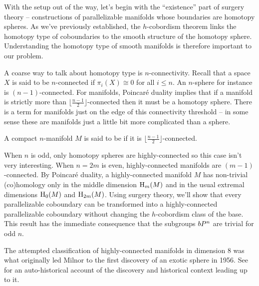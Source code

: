 With the setup out of the way, let's begin with the ``existence'' part of surgery theory -- constructions of parallelizable manifolds whose boundaries are homotopy spheres. As we've previously established, the $h$-cobordism theorem links the homotopy type of coboundaries to the smooth structure of the homotopy sphere. Understanding the homotopy type of smooth manifolds is therefore important to our problem.

A coarse way to talk about homotopy type is $n$-connectivity. Recall that a space $X$ is said to be $n$-connected if $\pi_i(X)\cong 0$ for all $i\leq n$. An $n$-sphere for instance is $(n-1)$-connected. For manifolds, Poincar\'e duality implies that if a manifold is strictly more than $\lfloor \frac{n-1}{2} \rfloor$-connected then it must be a homotopy sphere. There is a term for manifolds just on the edge of this connectivity threshold -- in some sense these are manifolds just a little bit more complicated than a sphere.

\begin{definition}
	A compact $n$-manifold $M$ is said to be  if it is $\lfloor \frac{n-1}{2} \rfloor$-connected. 
\end{definition}

When $n$ is odd, only homotopy spheres are highly-connected so this case isn't very interesting. When $n=2m$ is even, highly-connected manifolds are $(m-1)$-connected.
By Poincar\'e duality, a highly-connected manifold $M$ has non-trivial (co)homology only in the middle dimension $\operatorname{H}_m(M)$ and in the usual extremal dimensions $\operatorname{H}_0(M)$ and $\operatorname{H}_{2m}(M)$.
Using surgery theory, we'll show that every parallelizable coboundary can be transformed into a highly-connected parallelizable coboundary without changing the $h$-cobordism class of the base. This result has the immediate consequence that the subgroups $bP^n$ are trivial for odd $n$. 

\begin{remark}
	The attempted classification of highly-connected manifolds in dimension $8$ was what originally led Milnor to the first discovery of an exotic sphere in 1956. See \cite{milnor2000exotic} for an auto-historical account of the discovery and historical context leading up to it.
\end{remark}

